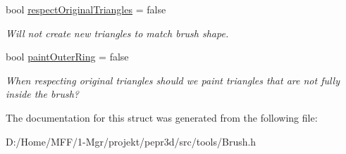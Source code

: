 \begin{DoxyCompactItemize}
bool \mbox{\hyperlink{structpepr3d_1_1_brush_settings_adddaabb9e5cd0271e781423eb77765db}{respect\+Original\+Triangles}} = false
\begin{DoxyCompactList}\small\item\em Will not create new triangles to match brush shape. \end{DoxyCompactList}\item 
\mbox{\label{structpepr3d_1_1_brush_settings_abe64fa6555c4a22a17cdf58779b0288e}} 
bool \mbox{\hyperlink{structpepr3d_1_1_brush_settings_abe64fa6555c4a22a17cdf58779b0288e}{paint\+Outer\+Ring}} = false
\begin{DoxyCompactList}\small\item\em When respecting original triangles should we paint triangles that are not fully inside the brush? \end{DoxyCompactList}\end{DoxyCompactItemize}


The documentation for this struct was generated from the following file\+:\begin{DoxyCompactItemize}
\item 
D\+:/\+Home/\+M\+F\+F/1-\/\+Mgr/projekt/pepr3d/src/tools/Brush.\+h\end{DoxyCompactItemize}
